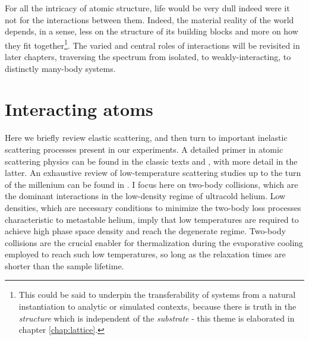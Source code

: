 	

	


	
	For all the intricacy of atomic structure, life would be very dull indeed were it not for the interactions between them.
	Indeed, the material reality of the world depends, in a sense, less on the structure of its building blocks and more on how they fit together\footnote{This could be said to underpin the transferability of systems from a natural instantiation to analytic or simulated contexts, because there is truth in the \emph{structure} which is independent of the \emph{substrate} - this theme is elaborated in chapter \ref{chap:lattice}.}.
	The varied and central roles of interactions will be revisited in later chapters, traversing the spectrum from isolated, to weakly-interacting, to distinctly many-body systems.
	

\section{Interacting atoms}

	
	Here we briefly review elastic scattering, and then turn to important inelastic scattering processes present in our experiments.
	A detailed primer in atomic scattering physics can be found in the classic texts \cite{PitaevskiiStringari} and \cite{PethickSmith}, with more detail in the latter.
	An exhaustive review of low-temperature scattering studies up to the turn of the millenium can be found in \cite{Weiner99}.
	I focus here on two-body collisions, which are the dominant interactions in the low-density regime of ultracold helium.
	Low densities, which are necessary conditions to minimize the two-body loss processes characteristic to metastable helium, imply that low temperatures are required to achieve high phase space density and reach the degenerate regime.
	Two-body collisions are the crucial enabler for thermalization during the evaporative cooling employed to reach such low temperatures, so long as the relaxation times are shorter than the sample lifetime.

